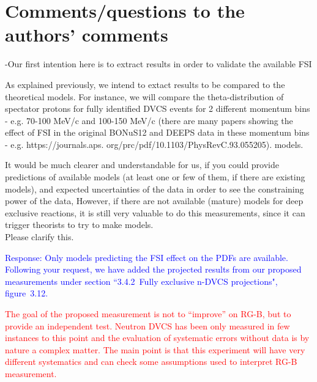 \section*{Comments/questions to  the authors' comments}
 
  
 \begin{itemize}
  {\color{red} \item  -Our first intention here is to extract results in order 
     to validate the available FSI
  \item  As explained previously, we intend to extact results to be compared to 
     the theoretical models. For instance, we will compare the 
       theta-distribution of spectator protons for fully identified DVCS events 
       for 2 different momentum bins - e.g. 70-100 MeV/c and 100-150 MeV/c 
       (there are many papers showing the effect of FSI in the original
 BONuS12 and DEEPS data in these momentum bins - e.g. https://journals.aps.
 org/prc/pdf/10.1103/PhysRevC.93.055205).
 models.} \newline
 
 It would be much clearer and understandable for us, if you could provide 
       predictions of available models (at least one or few of them, if there 
       are existing models), and expected uncertainties of the data in order to 
       see the constraining power of the data, However, if there are not 
       available (mature) models for deep exclusive reactions, it is still very 
       valuable to do this measurements, since it can trigger theorists to try 
       to make models. \\
  Please clarify this.

  
  \textcolor{blue}{Response: Only models predicting the FSI effect on the PDFs 
       are available. Following your request, we have added the projected 
       results from our proposed measurements under section ``3.4.2~Fully 
       exclusive n-DVCS projections", figure~3.12. }
  
  \textcolor{red}{
  \item   The goal of the proposed measurement is not to ``improve'' on RG-B, 
     but to provide an independent test. Neutron DVCS has been only measured in 
       few instances to this point and the evaluation of systematic errors 
       without data is by nature a complex matter. The main point is that this 
       experiment will have very different systematics and can check some 
       assumptions used to interpret RG-B measurement.
  }
  \newline
  

\end{itemize}
